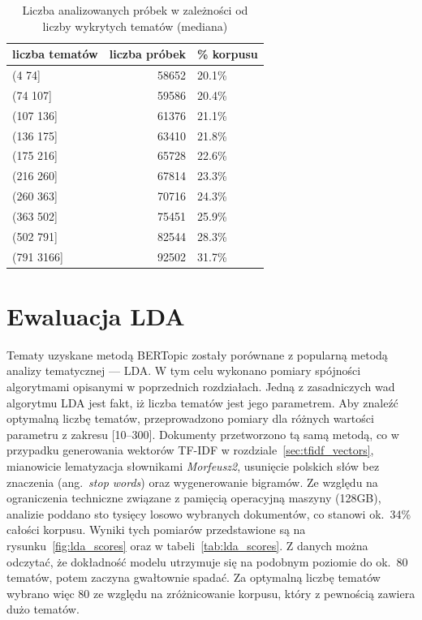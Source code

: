 		\begin{table}[htb]
			\caption{Liczba analizowanych próbek w zależności od liczby wykrytych tematów (mediana)}\label{tab:support}
			\centering
			\begin{tabular}{lrl}
				\toprule
				liczba tematów  &  liczba próbek	&	\% korpusu \\
				\midrule
				(4 74]     &  58652 &	20.1\% \\
				(74 107]   &  59586 &	20.4\% \\
				(107 136]  &  61376 &	21.1\% \\
				(136 175]  &  63410 &	21.8\% \\
				(175 216]  &  65728 &	22.6\% \\
				(216 260]  &  67814 &	23.3\% \\
				(260 363]  &  70716 &	24.3\% \\
				(363 502]  &  75451 &	25.9\% \\
				(502 791]  &  82544 &	28.3\% \\
				(791 3166] &  92502 &	31.7\% \\
				\bottomrule
			\end{tabular}
		\end{table}

\section{Ewaluacja LDA}\label{sec:lda}
	Tematy uzyskane metodą BERTopic zostały porównane z popularną metodą analizy tematycznej --- LDA\@.
	W tym celu wykonano pomiary spójności algorytmami opisanymi w poprzednich rozdziałach.
	Jedną z zasadniczych wad algorytmu LDA jest fakt, iż liczba tematów jest jego parametrem.
	Aby znaleźć optymalną liczbę tematów, przeprowadzono pomiary dla różnych wartości parametru z zakresu [10--300].
	Dokumenty przetworzono tą samą metodą, co w przypadku generowania wektorów TF-IDF w rozdziale~\ref{sec:tfidf_vectors},
		mianowicie lematyzacja słownikami \emph{Morfeusz2}, usunięcie polskich słów bez znaczenia (ang.\ \emph{stop words}) oraz wygenerowanie bigramów.
	Ze względu na ograniczenia techniczne związane z pamięcią operacyjną maszyny (128GB), analizie poddano sto tysięcy losowo wybranych dokumentów,
		co stanowi ok.~34\% całości korpusu.
	Wyniki tych pomiarów przedstawione są na rysunku~\ref{fig:lda_scores} oraz w tabeli~\ref{tab:lda_scores}.
	Z danych można odczytać, że dokładność modelu utrzymuje się na podobnym poziomie do ok.~80 tematów, potem zaczyna gwałtownie spadać.
	Za optymalną liczbę tematów wybrano więc 80 ze względu na zróżnicowanie korpusu, który z pewnością zawiera dużo tematów.

